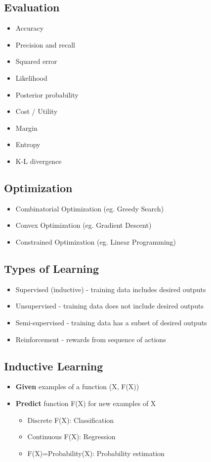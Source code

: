 \subsection{Evaluation}
\begin{itemize}
  \item Accuracy
  \item Precision and recall
  \item Squared error
  \item Likelihood
  \item Posterior probability
  \item Cost / Utility
  \item Margin
  \item Entropy
  \item K-L divergence
\end{itemize}

\subsection{Optimization}
\begin{itemize}
  \item Combinatorial Optimization (eg. Greedy Search)
  \item Convex Optimization (eg. Gradient Descent)
  \item Constrained Optimization (eg. Linear Programming)
\end{itemize}

\subsection{Types of Learning}
\begin{itemize}
  \item Supervised (inductive) - training data includes desired outputs
  \item Unsupervised - training data does not include desired outputs
  \item Semi-supervised - training data has a subset of desired outputs
  \item Reinforcement - rewards from sequence of actions
\end{itemize}

\subsection{Inductive Learning}
\begin{itemize}
  \item \textbf{Given} examples of a function (X, F(X))
  \item \textbf{Predict} function F(X) for new examples of X
  \begin{itemize}
    \item Discrete F(X): Classification
    \item Continuous F(X): Regression
    \item F(X)=Probability(X): Probability estimation
  \end{itemize}
\end{itemize}

